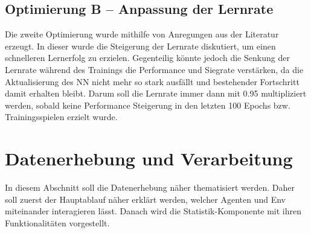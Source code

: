 \subsection{Optimierung B -- Anpassung der Lernrate} \label{subsec:Konzept_Optimierung02}
Die zweite Optimierung wurde mithilfe von Anregungen aus der Literatur \cite[S. 331 f.]{DRL_Lapan} erzeugt. In dieser wurde die Steigerung der Lernrate diskutiert, um einen schnelleren Lernerfolg zu erzielen. Gegenteilig könnte jedoch die Senkung der Lernrate während des Trainings die Performance und Siegrate verstärken, da die Aktualisierung des NN nicht mehr so stark ausfällt und bestehender Fortschritt damit erhalten bleibt. Darum soll die Lernrate immer dann mit 0.95 multipliziert werden, sobald keine Performance Steigerung in den letzten 100 Epochs bzw. Trainingsspielen erzielt wurde.

\section{Datenerhebung und Verarbeitung} \label{sec:Konzept_Datenerhebung_Verarbeitung}
In diesem Abschnitt soll die Datenerhebung näher thematisiert werden. Daher soll zuerst der Hauptablauf näher erklärt werden, welcher Agenten und Env miteinander interagieren lässt. Danach wird die Statistik-Komponente mit ihren Funktionalitäten vorgestellt.

